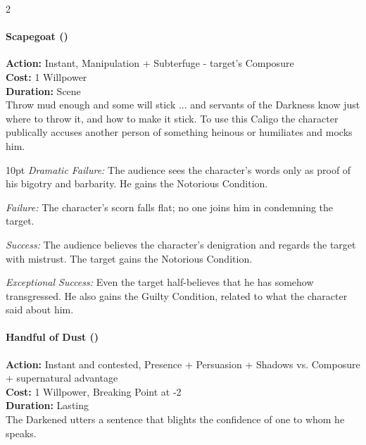 \begin{multicols}{2}
\paragraph*{Scapegoat (\textbullet\textbullet)}

\noindent \textbf{Action:} Instant, Manipulation + Subterfuge - target's Composure\\

\noindent \textbf{Cost:} 1 Willpower\\

\noindent \textbf{Duration:} Scene \\

Throw mud enough and some will stick ... and servants of the Darkness know just where to throw it, and how to make it stick. To use this Caligo the character publically accuses another person of something heinous or humiliates and mocks him.

\begin{myindentpar}{10pt}  \emph{Dramatic Failure:}  The audience sees the character's words only as proof of his bigotry and barbarity. He gains the Notorious Condition.
   
    \emph{Failure:} The character's scorn falls flat; no one joins him in condemning the target.
    
    \emph{Success:} The audience believes the character's denigration and regards the target with mistrust. The target gains the Notorious Condition.
    
    \emph{Exceptional Success:} Even the target half-believes that he has somehow transgressed. He also gains the Guilty Condition, related to what the character said about him.\end{myindentpar}


\paragraph*{Handful of Dust (\textbullet\textbullet)}

\noindent \textbf{Action:} Instant and contested, Presence + Persuasion + Shadows vs. Composure + supernatural advantage \\

\noindent \textbf{Cost:} 1 Willpower, Breaking Point at -2\\

\noindent \textbf{Duration:} Lasting \\

\noindent The Darkened utters a sentence that blights the confidence of one to whom he speaks.


\end{multicols}
